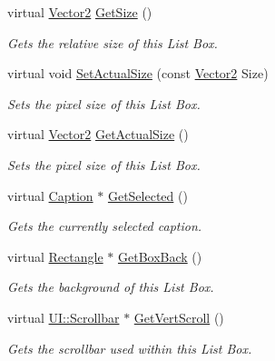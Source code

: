 \begin{DoxyCompactItemize}
virtual \hyperlink{classphys_1_1Vector2}{Vector2} \hyperlink{classphys_1_1UI_1_1ListBox_a7af2cced185d63be6a62d5122c700d81}{GetSize} ()
\begin{DoxyCompactList}\small\item\em Gets the relative size of this List Box. \item\end{DoxyCompactList}\item 
virtual void \hyperlink{classphys_1_1UI_1_1ListBox_abb26f02d8ab44b9ebd6add14a9ba809c}{SetActualSize} (const \hyperlink{classphys_1_1Vector2}{Vector2} Size)
\begin{DoxyCompactList}\small\item\em Sets the pixel size of this List Box. \item\end{DoxyCompactList}\item 
virtual \hyperlink{classphys_1_1Vector2}{Vector2} \hyperlink{classphys_1_1UI_1_1ListBox_a23133ed4a98994d838acee4c6a981e04}{GetActualSize} ()
\begin{DoxyCompactList}\small\item\em Sets the pixel size of this List Box. \item\end{DoxyCompactList}\item 
virtual \hyperlink{classphys_1_1UI_1_1Caption}{Caption} $\ast$ \hyperlink{classphys_1_1UI_1_1ListBox_a729f4ef3e0bc10bf8e96f20a83767484}{GetSelected} ()
\begin{DoxyCompactList}\small\item\em Gets the currently selected caption. \item\end{DoxyCompactList}\item 
virtual \hyperlink{classphys_1_1UI_1_1Rectangle}{Rectangle} $\ast$ \hyperlink{classphys_1_1UI_1_1ListBox_a087fba492ebd70a58d2772fccbfec466}{GetBoxBack} ()
\begin{DoxyCompactList}\small\item\em Gets the background of this List Box. \item\end{DoxyCompactList}\item 
virtual \hyperlink{classphys_1_1UI_1_1Scrollbar}{UI::Scrollbar} $\ast$ \hyperlink{classphys_1_1UI_1_1ListBox_a9f62475c3a81772407af38076363060e}{GetVertScroll} ()
\begin{DoxyCompactList}\small\item\em Gets the scrollbar used within this List Box. \item\end{DoxyCompactList}\end{DoxyCompactItemize}
